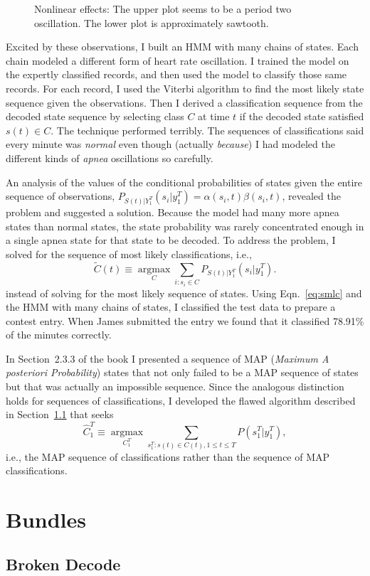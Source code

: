 \documentclass[]{article}
\newcommand{\ts}[3]{#1_{#2}^{#3}}                    %
\newcommand{\argmax}{\operatorname*{argmax}}
\newcommand{\ti}[2]{{#1}{(#2)}}                  %
\newcommand{\ie}{i.e.\xspace}
\newcommand{\plotsize}{%
  \fontsize{9}{9}%
  \selectfont}
\renewcommand{\comment}[1]{}
\newcommand{\IncludeApneaFig}[1]{\texttt{[image: ../figs/apnea/\#1.pdf]}}
\begin{document}
\begin{figure}
  \centering{\plotsize%
    \def\aT{\emph{a12} HR}%
    \def\aZ{\emph{a01} HR}%
    \IncludeApneaFig{ApneaNLD}}
  \caption[\comment{fig:ApneaNLD }Nonlinear effects]%
  {Nonlinear effects: The upper plot seems to be a period two
    oscillation.  The lower plot is approximately sawtooth.}\label{fig:ApneaNLD}
\end{figure}

Excited by these observations, I built an HMM with many chains of
states.  Each chain modeled a different form of heart rate
oscillation.  I trained the model on the expertly classified records,
and then used the model to classify those same records.  For each
record, I used the Viterbi algorithm to find the most likely state
sequence given the observations.  Then I derived a classification
sequence from the decoded state sequence by selecting class $C$ at
time $t$ if the decoded state satisfied $\ti{s}{t}\in C$.  The
technique performed terribly.  The sequences of classifications said
every minute was \emph{normal} even though (actually \emph{because}) I had
modeled the different kinds of \emph{apnea} oscillations so carefully.

An analysis of the values of the conditional probabilities of states given
the entire sequence of observations, $P_{\ti{S}{t}|\ts{Y}{1}{T}}
\left(s_i|\ts{y}{1}{T} \right) = \alpha(s_i,t) \beta(s_i,t)$,
revealed the problem and suggested a solution.  Because the model had
many more apnea states than normal states, the state probability was
rarely concentrated enough in a single apnea state for that state to
be decoded.  To address the problem, I solved for the sequence of most
likely classifications, \ie,
\begin{equation}
  \label{eq:smlc}
  \ti{\tilde C}{t} \equiv \argmax_C \sum_{i:s_i\in C}
  P_{\ti{S}{t}|\ts{Y}{1}{T}} \left(s_i|\ts{y}{1}{T} \right).
\end{equation}
instead of solving for the most likely sequence of states.  Using
Eqn.~\eqref{eq:smlc} and the HMM with many chains of states, I
classified the test data to prepare a contest entry.  When James
submitted the entry %
we found that it classified 78.91\% of the minutes correctly.

In Section~2.3.3 of the book I presented a sequence of MAP
(\emph{Maximum A posteriori Probability}) states that not only failed
to be a MAP sequence of states but that was actually an impossible
sequence.  Since the analogous distinction holds for sequences of
classifications, I developed the flawed algorithm described in
Section~\ref{sec:broken_decode} that seeks
\begin{equation}
  \label{eq:mlsc}
  {\ts{\hat C}{1}{T}} \equiv \argmax_{\ts{C}{1}{T} }
  \sum_{\ts{s}{1}{T}:\ti{s}{t}\in \ti{C}{t}, 1 \leq t \leq T} P\left(
    \ts{s}{1}{T} | \ts{y}{1}{T} \right),
\end{equation}
\ie, the MAP sequence of classifications rather than the sequence of
MAP classifications.

\section{Bundles}\label{sec:bundles}

\subsection{Broken Decode}\label{sec:broken_decode}
\end{document}
